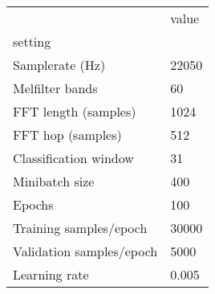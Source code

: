 \begin{tabular}{ll}
\toprule
{} &  value \\
setting                  &        \\
\midrule
Samplerate (Hz)          &  22050 \\
Melfilter bands          &     60 \\
FFT length (samples)     &   1024 \\
FFT hop (samples)        &    512 \\
Classification window    &     31 \\
Minibatch size           &    400 \\
Epochs                   &    100 \\
Training samples/epoch   &  30000 \\
Validation samples/epoch &   5000 \\
Learning rate            &  0.005 \\
\bottomrule
\end{tabular}
